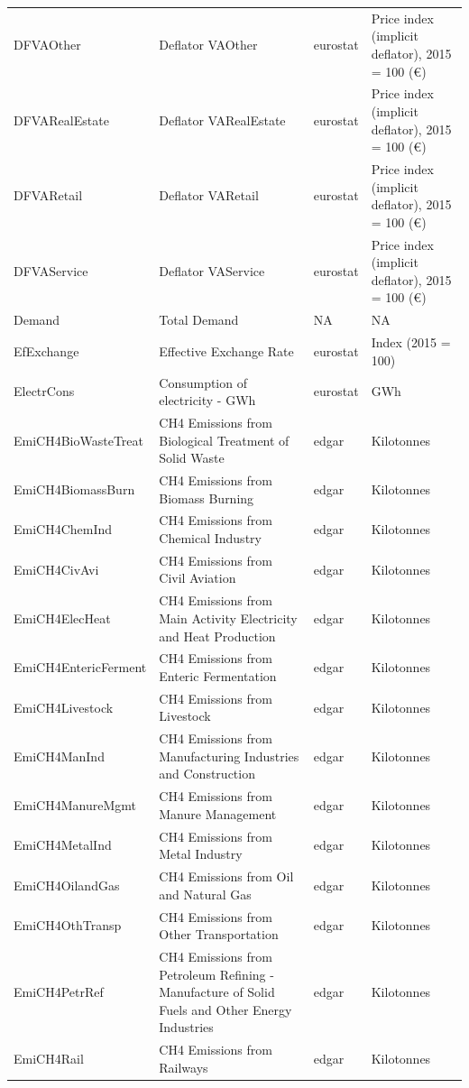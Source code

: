 \begin{longtable}[t]{>{\raggedright\arraybackslash}p{3.5cm}>{\raggedright\arraybackslash}p{5.5cm}>{\raggedright\arraybackslash}p{2cm}>{\raggedright\arraybackslash}p{4cm}}
DFVAOther & Deflator VAOther & eurostat & Price index (implicit deflator), 2015 = 100 (€)\\
DFVARealEstate & Deflator VARealEstate & eurostat & Price index (implicit deflator), 2015 = 100 (€)\\
DFVARetail & Deflator VARetail & eurostat & Price index (implicit deflator), 2015 = 100 (€)\\
DFVAService & Deflator VAService & eurostat & Price index (implicit deflator), 2015 = 100 (€)\\
\addlinespace
Demand & Total Demand & NA & NA\\
EfExchange & Effective Exchange Rate & eurostat & Index (2015 = 100)\\
ElectrCons & Consumption of electricity - GWh & eurostat & GWh\\
EmiCH4BioWasteTreat & CH4 Emissions from Biological Treatment of Solid Waste & edgar & Kilotonnes\\
EmiCH4BiomassBurn & CH4 Emissions from Biomass Burning & edgar & Kilotonnes\\
\addlinespace
EmiCH4ChemInd & CH4 Emissions from Chemical Industry & edgar & Kilotonnes\\
EmiCH4CivAvi & CH4 Emissions from Civil Aviation & edgar & Kilotonnes\\
EmiCH4ElecHeat & CH4 Emissions from Main Activity Electricity and Heat Production & edgar & Kilotonnes\\
EmiCH4EntericFerment & CH4 Emissions from Enteric Fermentation & edgar & Kilotonnes\\
EmiCH4Livestock & CH4 Emissions from Livestock & edgar & Kilotonnes\\
\addlinespace
EmiCH4ManInd & CH4 Emissions from Manufacturing Industries and Construction & edgar & Kilotonnes\\
EmiCH4ManureMgmt & CH4 Emissions from Manure Management & edgar & Kilotonnes\\
EmiCH4MetalInd & CH4 Emissions from Metal Industry & edgar & Kilotonnes\\
EmiCH4OilandGas & CH4 Emissions from Oil and Natural Gas & edgar & Kilotonnes\\
EmiCH4OthTransp & CH4 Emissions from Other Transportation & edgar & Kilotonnes\\
\addlinespace
EmiCH4PetrRef & CH4 Emissions from Petroleum Refining - Manufacture of Solid Fuels and Other Energy Industries & edgar & Kilotonnes\\
EmiCH4Rail & CH4 Emissions from Railways & edgar & Kilotonnes\\

\end{longtable}
